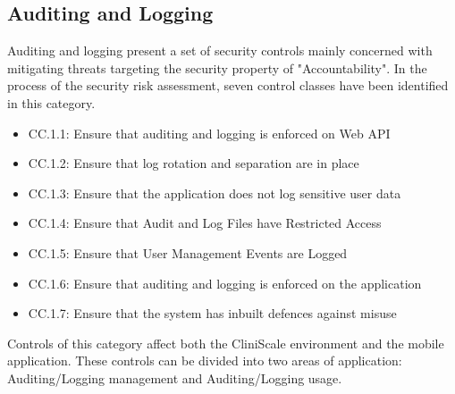 \subsection{Auditing and Logging}
Auditing and logging present a set of security controls mainly concerned with mitigating threats targeting the security property of "Accountability".
\newline
In the process of the security risk assessment, seven control classes have been identified in this category.
\begin{itemize}
    \item CC.1.1: Ensure that auditing and logging is enforced on Web API
    \item CC.1.2: Ensure that log rotation and separation are in place
    \item CC.1.3: Ensure that the application does not log sensitive user data
    \item CC.1.4: Ensure that Audit and Log Files have Restricted Access
    \item CC.1.5: Ensure that User Management Events are Logged
    \item CC.1.6: Ensure that auditing and logging is enforced on the application
    \item CC.1.7: Ensure that the system has inbuilt defences against misuse
\end{itemize}

Controls of this category affect both the CliniScale environment and the mobile application. 
These controls can be divided into two areas of application: Auditing/Logging management and Auditing/Logging usage.

